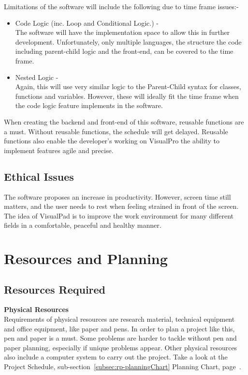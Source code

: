 \documentclass[conference]{IEEEtran}
\begin{document}
        Limitations of the software will include the following due to time frame issues:-
        \begin{itemize}
          \item Code Logic (inc. Loop and Conditional Logic.) -\\
            The software will have the implementation space to allow this in further development. Unfortunately, only multiple languages, the structure the code including parent-child logic and the front-end, can be covered to the time frame.
          \item Nested Logic -\\
            Again, this will use very similar logic to the Parent-Child syntax for classes, functions and variables. However, these will ideally fit the time frame when the code logic feature implements in the   software.
        \end{itemize}
        When creating the backend and front-end of this software, reusable functions are a must. Without reusable functions, the schedule will get delayed. Reusable functions also enable the developer's working on VisualPro the ability to implement features agile and precise. 
        
      \subsection{Ethical Issues}
        The software proposes an increase in productivity. However, screen time still matters, and the user needs to rest when feeling strained in front of the screen. The idea of VisualPad is to improve the work environment for many different fields in a comfortable, peaceful and healthy manner. 

    \section{Resources and Planning}
    \label{sec: resourcesPlanning}
      \subsection{Resources Required}
        \textbf{Physical Resources}\\
          Requirements of physical resources are research material, technical equipment and office equipment, like paper and pens. In order to plan a project like this, pen and paper is a must. Some problems are harder to tackle without pen and paper planning, especially if unique problems appear. Other physical resources also include a computer system to carry out the project. Take a look at the Project Schedule, sub-section~\ref{subsec:rp-planningChart} Planning Chart, page~\pageref{subsec:rp-planningChart}.
\end{document}
